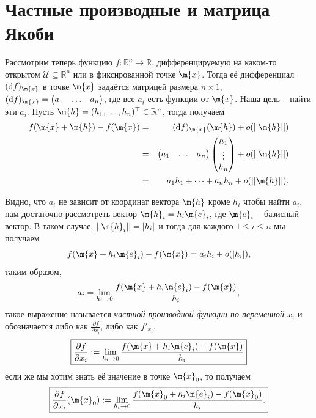 \section{Частные производные и матрица Якоби}

Рассмотрим теперь функцию $f:\mathbb{R}^n \to \mathbb{R}$, дифференцируемую на каком-то открытом $\mathscr{U} \subseteq \mathbb{R}^n$ или в фиксированной точке $\m{x}$. Тогда её дифференциал $(\mathrm{d}f)_\m{x}$ в точке $\m{x}$ задаётся матрицей размера $n\times 1$, $(\mathrm{d}f)_\m{x} = \begin{pmatrix}
    a_1 & \ldots & a_n
\end{pmatrix}$, где все $a_i$ есть функции от $\m{x}$. Наша цель -- найти эти $a_i$. Пусть $\m{h} = (h_1, \ldots, h_n)^\top \in \mathbb{R}^n$, тогда получаем
\begin{eqnarray*}
    f(\m{x} + \m{h}) - f(\m{x}) &=& (\mathrm{d}f)_\m{x}(\m{h}) + o(||\m{h}||) \\
    &=& \begin{pmatrix}
        a_1 & \ldots & a_n
    \end{pmatrix} \begin{pmatrix}
        h_1 \\ \vdots \\ h_n  \end{pmatrix} + o(||\m{h}||) \\
        &=& a_1h_1 + \cdots + a_nh_n + o(||\m{h}||).
\end{eqnarray*}

Видно, что $a_i$ не зависит от координат вектора $\m{h}$ кроме $h_i$ \ie чтобы найти $a_i$, нам достаточно рассмотреть вектор $\m{h}_i = h_i \m{e}_i$, где $\m{e}_i$ -- базисный вектор. В таком случае, $||\m{h}_i|| = |h_i|$ и тогда для каждого $1 \le i \le n$ мы получаем
\[
 f(\m{x} + h_i \m{e}_i) - f(\m{x}) = a_ih_i + o(|h_i|),
\]
таким образом, 
\[
 a_i = \lim_{h_i \to 0} \frac{f(\m{x} + h_i \m{e}_i) - f(\m{x})}{h_i},
\]
такое выражение называется \textit{частной производной функции по переменной $x_i$} и обозначается либо как $\frac{\partial f}{\partial x_i}$, либо как $f'_{x_i}$, \ie 
\begin{equation}\label{partial_i}
  \boxed{
 \frac{\partial f}{\partial x_i}: = \lim_{h_i \to 0} \frac{f(\m{x} + h_i \m{e}_i) - f(\m{x})}{h_i}}    
\end{equation}
если же мы хотим знать её значение в точке $\m{x}_0$, то получаем
\begin{equation}\label{partial_i(o)}
    \boxed{
      \frac{\partial f}{\partial x_i}(\m{x}_0): = \lim_{h_i \to 0} \frac{f(\m{x}_0 + h_i \m{e}_i) - f(\m{x}_0)}{h_i}.
    }
\end{equation}

